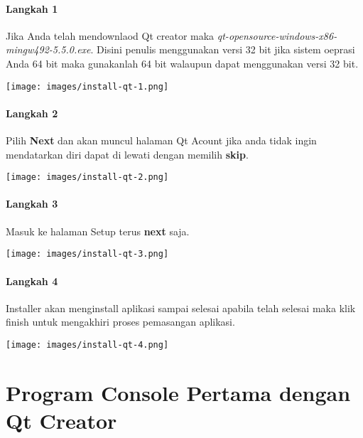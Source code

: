 \paragraph{Langkah 1}
  Jika Anda telah mendownlaod Qt creator maka
  \textit{qt-opensource-windows-x86-mingw492-5.5.0.exe}. Disini penulis
  menggunakan versi 32 bit jika sistem oeprasi Anda 64 bit maka
  gunakanlah 64 bit walaupun dapat menggunakan versi 32 bit.
 
\begin{center}
	 \texttt{[image: images/install-qt-1.png]}
\end{center}
 



\paragraph{Langkah 2}
  Pilih \textbf{Next} dan akan muncul halaman Qt Acount jika anda tidak
  ingin mendatarkan diri dapat di lewati dengan memilih \textbf{skip}.

\begin{center}
	 \texttt{[image: images/install-qt-2.png]}
\end{center}
 


  
\paragraph{Langkah 3}
  Masuk ke halaman Setup terus \textbf{next} saja.

  
\begin{center}
	 \texttt{[image: images/install-qt-3.png]}
\end{center}
 


  
\paragraph{Langkah 4}
  Installer akan menginstall aplikasi sampai selesai apabila telah
  selesai maka klik finish untuk mengakhiri proses pemasangan aplikasi.


  


\begin{center}

	\texttt{[image: images/install-qt-4.png]}
\end{center}

\section{Program Console Pertama dengan Qt
Creator}\label{program-console-pertama-dengan-qt-creator}



